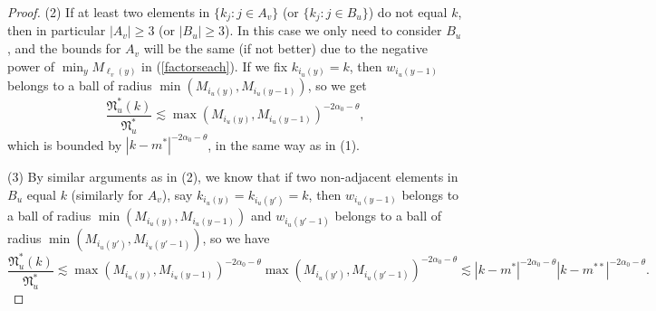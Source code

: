 \documentclass[11 pt,reqno]{amsart}
\theoremstyle{definition}
\theoremstyle{remark}
\numberwithin{equation}{section}
\newcommand{\Nf}{\mathfrak{N}}
\begin{document}
{\begin{proof}
(2) If at least two elements in $\{k_j:j\in A_v\}$ (or $\{k_j:j\in B_u\}$) do not equal $k$, then in particular $|A_v|\geq 3$ (or $|B_u|\geq 3$). In this case we only need to consider $B_u$, and the bounds for $A_v$ will be the same (if not better) due to the negative power of $\min_y M_{\ell_v(y)}$ in (\ref{factorseach}). If we fix $k_{i_u(y)}=k$, then $w_{i_u(y-1)}$ belongs to a ball of radius $\min(M_{i_u(y)},M_{i_u(y-1)})$, so we get
\begin{equation}\label{quotientest3}\frac{\Nf_u^*(k)}{\Nf_u^*}\lesssim\max(M_{i_u(y)},M_{i_u(y-1)})^{-2\alpha_0-\theta},\end{equation} which is bounded by $|k-m^*|^{-2\alpha_0-\theta}$, in the same way as in (1).

(3) By similar arguments as in (2), we know that if two non-adjacent elements in $B_u$ equal $k$ (similarly for $A_v$), say $k_{i_u(y)}=k_{i_u(y')}=k$, then $w_{i_u(y-1)}$ belongs to a ball of radius $\min(M_{i_u(y)},M_{i_u(y-1)})$ and $w_{i_u(y'-1)}$ belongs to a ball of radius $\min(M_{i_u(y')},M_{i_u(y'-1)})$, so we have
\[\frac{\Nf_u^*(k)}{\Nf_u^*}\lesssim \max(M_{i_u(y)},M_{i_u(y-1)})^{-2\alpha_0-\theta}\max(M_{i_u(y')},M_{i_u(y'-1)})^{-2\alpha_0-\theta}\lesssim |k-m^*|^{-2\alpha_0-\theta}|k-m^{**}|^{-2\alpha_0-\theta}.\]


\end{proof}}
\end{document}
